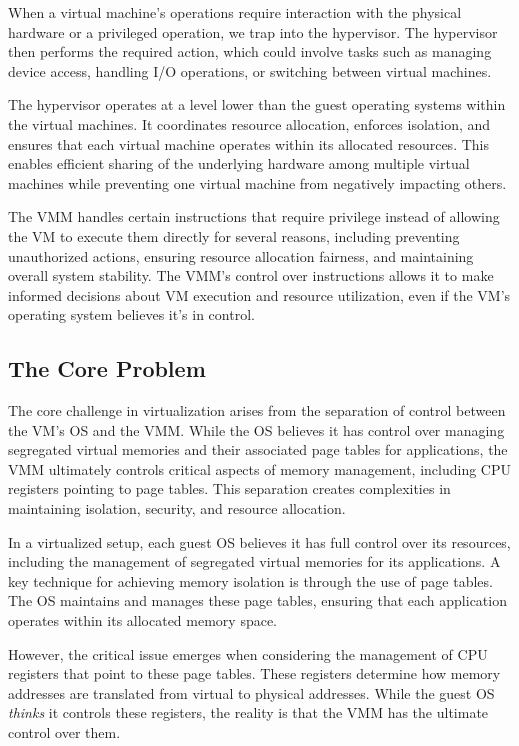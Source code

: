 \documentclass{report}
\newcommand{\corollaryBegin}[1]{\begin{tcolorbox}[colback=teal!5!white,colframe=black!75!teal,title={Corollary:
      #1}]}
\newcommand{\corollaryEnd}{\end{tcolorbox}}
\begin{document}
When a virtual machine's operations require interaction with the physical hardware or a privileged
operation, we trap into the hypervisor. The hypervisor then performs the required action, which
could involve tasks such as managing device access, handling I/O operations, or switching between
virtual machines.

The hypervisor operates at a level lower than the guest operating systems within the virtual
machines. It coordinates resource allocation, enforces isolation, and ensures that each virtual
machine operates within its allocated resources. This enables efficient sharing of the underlying
hardware among multiple virtual machines while preventing one virtual machine from negatively
impacting others. 


\corollaryBegin{VMM v. VM's OS}
The VMM handles certain instructions that require privilege instead of allowing the VM to execute
them directly for several reasons, including preventing unauthorized actions, ensuring resource
allocation fairness, and maintaining overall system stability. The VMM's control over instructions
allows it to make informed decisions about VM execution and resource utilization, even if the VM's
operating system believes it's in control. 
\corollaryEnd


\subsection{The Core Problem}
The core challenge in virtualization arises from the separation of control between the VM's OS and
the VMM. While the OS believes it has control over managing segregated virtual memories and their
associated page tables for applications, the VMM ultimately controls critical aspects of memory
management, including CPU registers pointing to page tables. This separation creates complexities in
maintaining isolation, security, and resource allocation.

In a virtualized setup, each guest OS believes it has full control over its resources, including the
management of segregated virtual memories for its applications. A key technique for achieving memory
isolation is through the use of page tables. The OS maintains and manages these page tables,
ensuring that each application operates within its allocated memory space.

However, the critical issue emerges when considering the management of CPU registers that point to
these page tables. These registers determine how memory addresses are translated from virtual to
physical addresses. While the guest OS \textit{thinks} it controls these registers, the reality is
that the VMM has the ultimate control over them.
\end{document}
